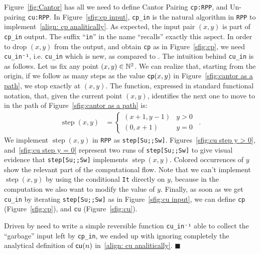 \documentclass[runningheads]{llncs}
\newcommand*{\qeda}{\hfill\ensuremath{\blacksquare}}%
\begin{document}
Figure~\ref{fig:Cantor} has all we need to define Cantor Pairing \lstinline|cp:RPP|, and Un-pairing \lstinline|cu:RPP|.
In Figure~\ref{sfig:cp input}, \lstinline|cp_in| is the natural algorithm in \lstinline|RPP| to implement~\eqref{align: cp analitically}. As expected, the input pair $(x,y)$ is part of \lstinline|cp_in| output. The suffix ``\lstinline|in|'' in the name ``recalls'' exactly this aspect. In order to drop $(x,y)$ from the output, and obtain \lstinline|cp| as in Figure~\ref{sfig:cp}, we need \lstinline|cu_in⁻¹|, i.e. \lstinline|cu_in| which is new, as compared to \cite{DBLP:journals/tcs/PaoliniPR20}. The intuition behind \lstinline|cu_in| is as follows. Let us fix any point $ (x, y) \in \mathbb{N}^2 $. We can realize that, starting from the origin, if we follow as many steps as the value $ \mathsf{cp}(x, y) $ in Figure~\ref{sfig:cantor as a path}, we stop exactly at $ (x,y) $. The function, expressed in standard functional notation, that, given the current point $ (x,y) $, identifies the next one to move to in the path of Figure~\ref{sfig:cantor as a path} is:
\begin{align*}
    \operatorname{step}(x,y) & =
    \begin{cases} (x+1,y-1) &  y > 0 \\ (0, x+1) &   y = 0 \end{cases}
    \enspace .
\end{align*}
We implement $ \operatorname{step}(x,y) $ in \lstinline|RPP| as \lstinline|step[Su;;Sw]|. Figures~\ref{sfig:cu step y > 0}, and~\ref{sfig:cu step y = 0} represent two runs of \lstinline|step[Su;;Sw]| to give visual evidence that \lstinline|step[Su;;Sw]| implements $\operatorname{step}(x,y)$. Colored occurrences of $ y $ show the relevant part of the computational flow. Note that we can't implement $ \operatorname{step}(x,y) $ by using the conditional \lstinline|It| directly on $y$, because in the computation we also want to modify the value of $y$. Finally, as soon as we get \lstinline|cu_in| by iterating \lstinline|step[Su;;Sw]| as in Figure~\ref{sfig:cu input}, we can define \lstinline|cp| (Figure~\ref{sfig:cp}), and \lstinline|cu| (Figure~\ref{sfig:cu}).
\begin{remark}
Driven by need to write a simple reversible function \lstinline|cu_in⁻¹| able to collect the ``garbage'' input left by \lstinline|cp_in|, we ended up with ignoring completely the analytical definition of $ \mathsf{cu}(n) $ in~\eqref{align: cu analitically}.
\qeda
\end{remark}
\end{document}
